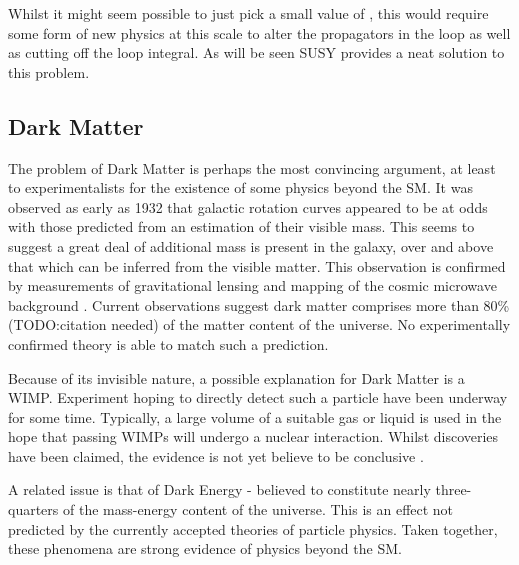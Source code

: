 Whilst it might seem possible to just pick a small value of \LambdaUV, this
would require some form of new physics at this scale to alter the propagators in
the loop as well as cutting off the loop integral. As will be seen \ac{SUSY}
provides a neat solution to this problem.

\subsection{Dark Matter}
\label{sec:susy_darkmatter}
The problem of Dark Matter is perhaps the most convincing argument, at least to
experimentalists for the existence of some physics beyond the \ac{SM}. It was
observed as early as 1932 \cite{darkmatter_review} that galactic rotation curves
appeared to be at odds with those predicted from an estimation of their visible
mass. This seems to suggest a great deal of additional mass is present in the
galaxy, over and above that which can be inferred from the visible matter. This
observation is confirmed by measurements of gravitational lensing
\cite{bullet_cluster} and mapping of the cosmic microwave background
\cite{wmap_7year}. Current observations suggest dark matter comprises more than
80\% (TODO:citation needed) of the matter content of the universe. No
experimentally confirmed theory is able to match such a prediction.

Because of its invisible nature, a possible explanation for Dark Matter is a
\acl{WIMP}. Experiment hoping to directly detect such a particle have been
underway for some time. Typically, a large volume of a suitable gas or liquid is
used in the hope that passing \acp{WIMP} will undergo a nuclear
interaction. Whilst discoveries have been claimed, the evidence is not yet
believe to be conclusive \cite{dama_libra}.

A related issue is that of Dark Energy - believed to constitute nearly
three-quarters of the mass-energy content of the universe. This is an effect not
predicted by the currently accepted theories of particle physics. Taken
together, these phenomena are strong evidence of physics beyond the \ac{SM}.


